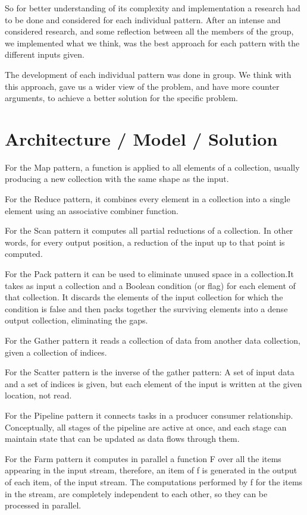 \documentclass[10pt,journal,compsoc]{IEEEtran}
\begin{document}
So for better understanding of its complexity and implementation a research had to be done and considered for each individual pattern. After an intense and considered research, and some reflection between all the members of the group, we implemented what we think, was the best approach for each pattern with the different inputs given. 
    
The development of each individual pattern was done in group. We think with this approach, gave us a wider view of the problem, and  have  more counter arguments, to achieve a better solution for the specific problem.
    
    



\section{Architecture / Model / Solution}
For the  Map pattern, a function is applied to all elements of a collection, usually producing a new collection with the same shape as the input.

For the Reduce pattern, it combines every element in a collection into a single element using an associative combiner function.

For the Scan pattern it computes all partial reductions of a collection. In other words, for every output position, a reduction of the input up to that point is computed. 

For the Pack pattern it can be used to eliminate unused space in a collection.It takes as input a collection and a Boolean condition (or flag) for each element of that collection. It discards the elements of the input collection for which the condition is false and then packs together the surviving elements into a dense output collection, eliminating the gaps. 

For the Gather pattern it reads a collection of data from another data collection, given a collection of indices.

For the Scatter pattern is the inverse of the gather pattern: A set of input data and a set of indices is given, but each element of the input is written at the given location, not read.

For the Pipeline pattern it connects tasks in a producer consumer relationship. Conceptually, all stages of the pipeline are active at once, and each stage can maintain state that can be updated as data flows through them.

For the Farm pattern it computes in parallel a function F over all the items appearing in the input stream, therefore, an item of f is generated in the output of each item, of the input stream. The computations performed by f for the items in the stream, are completely independent to each other, so they can be processed in parallel.
\end{document}
